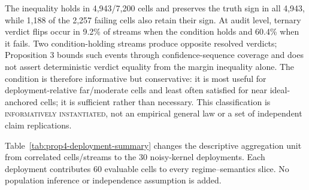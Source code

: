 \documentclass[11pt,a4paper]{article}
\begin{document}
The inequality holds in 4,943/7,200 cells and preserves the truth sign in all
4,943, while 1,188 of the 2,257 failing cells also retain their sign. At audit
level, ternary verdict flips occur in 9.2\% of streams when the condition holds
and 60.4\% when it fails. Two condition-holding streams produce opposite
resolved verdicts; Proposition 3 bounds such events through confidence-sequence
coverage and does not assert deterministic verdict equality from the margin
inequality alone. The condition is therefore informative but conservative:
it is most useful for deployment-relative far/moderate cells and least often
satisfied for near ideal-anchored cells; it is sufficient rather than
necessary. This classification is
\textsc{informatively instantiated}, not an empirical general law or a set of
independent claim replications.

Table~\ref{tab:prop4-deployment-summary} changes the descriptive aggregation
unit from correlated cells/streams to the 30 noisy-kernel deployments. Each
deployment contributes 60 evaluable cells to every regime--semantics slice.
No population inference or independence assumption is added.
\end{document}
